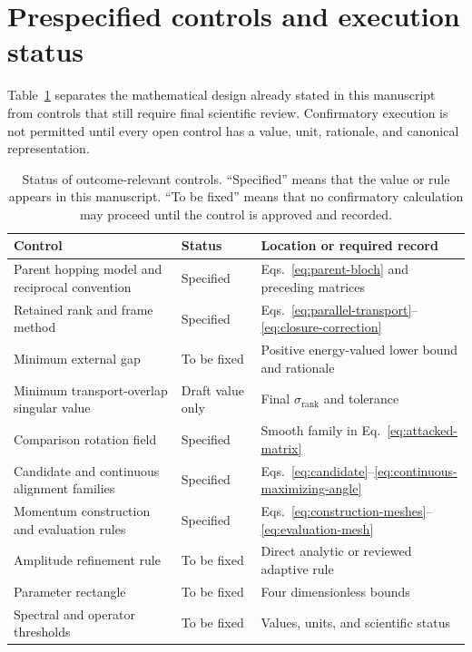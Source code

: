 \documentclass[11pt]{article}
\begin{document}
\section{Prespecified controls and execution status}

Table~\ref{tab:controls} separates the mathematical design already stated in this
manuscript from controls that still require final scientific review. Confirmatory
execution is not permitted until every open control has a value, unit, rationale, and
canonical representation.

\begin{table}[htbp]
\centering
\caption{Status of outcome-relevant controls. ``Specified'' means that the value or rule
appears in this manuscript. ``To be fixed'' means that no confirmatory calculation may
proceed until the control is approved and recorded.}
\label{tab:controls}
\begin{tabular}{>{\raggedright\arraybackslash}p{}
                >{\raggedright\arraybackslash}p{}
                >{\raggedright\arraybackslash}p{}}
\toprule
Control & Status & Location or required record \\
\midrule
Parent hopping model and reciprocal convention & Specified &
Eqs.~\eqref{eq:parent-bloch} and preceding matrices \\
Retained rank and frame method & Specified &
Eqs.~\eqref{eq:parallel-transport}--\eqref{eq:closure-correction} \\
Minimum external gap & To be fixed & Positive energy-valued lower bound and rationale \\
Minimum transport-overlap singular value & Draft value only &
Final $\sigma_{\mathrm{rank}}$ and tolerance \\
Comparison rotation field & Specified & Smooth family in
Eq.~\eqref{eq:attacked-matrix} \\
Candidate and continuous alignment families & Specified &
Eqs.~\eqref{eq:candidate}--\eqref{eq:continuous-maximizing-angle} \\
Momentum construction and evaluation rules & Specified &
Eqs.~\eqref{eq:construction-meshes}--\eqref{eq:evaluation-mesh} \\
Amplitude refinement rule & To be fixed & Direct analytic or reviewed adaptive rule \\
Parameter rectangle & To be fixed & Four dimensionless bounds \\
Spectral and operator thresholds & To be fixed & Values, units, and scientific status \\

\end{tabular}
\end{table}
\end{document}
